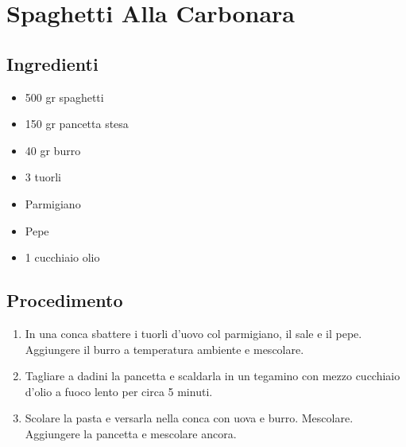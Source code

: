 \section{Spaghetti Alla Carbonara}
\subsection{Ingredienti}
\begin{itemize}
\item 500 gr spaghetti  
\item 150 gr pancetta stesa  
\item 40 gr burro  
\item 3 tuorli  
\item Parmigiano  
\item Pepe  
\item 1 cucchiaio olio 
\end{itemize}
\subsection{Procedimento}
\begin{enumerate}
\item  In una conca sbattere i tuorli d'uovo col parmigiano, il sale e il pepe. Aggiungere il burro a temperatura ambiente e mescolare.  
\item  Tagliare a dadini la pancetta e scaldarla in un tegamino con mezzo cucchiaio d'olio a fuoco lento per circa 5 minuti.  
\item  Scolare la pasta e versarla nella conca con uova e burro. Mescolare. Aggiungere la pancetta e mescolare ancora.
\end{enumerate}

